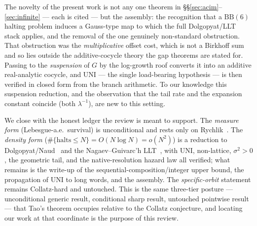 \documentclass[11pt]{article}
\begin{document}
The novelty of the present work is not any one theorem in
\S\S\ref{sec:acim}--\ref{sec:infinite} --- each is cited --- but the assembly:
the recognition that a $\mathrm{BB}(6)$ halting problem induces a Gauss-type map
to which the full Dolgopyat/LLT stack applies, and the removal of the one
genuinely non-standard obstruction. That obstruction was the
\emph{multiplicative} offset cost, which is not a Birkhoff sum and so lies
outside the additive-cocycle theory the gap theorems are stated for. Passing to
the \emph{suspension} of $G$ by the log-growth roof converts it into an additive
real-analytic cocycle, and UNI --- the single load-bearing hypothesis --- is
then verified in closed form from the branch arithmetic. To our knowledge this
suspension reduction, and the observation that the tail rate and the expansion
constant coincide (both $\lambda^{-1}$), are new to this setting.

We close with the honest ledger the review is meant to support. The
\emph{measure form} (Lebesgue-a.e.\ survival) is unconditional and rests only on
Rychlik~\cite{Rychlik1983}. The \emph{density form} ($\#\{\text{halts}\le
N\}=O(N\log N)=o(N^2)$) is a reduction to
Dolgopyat/Naud~\cite{Dolgopyat1998,Naud2005} and the Nagaev--Guivarc'h
LLT~\cite{HennionHerve2001,AaronsonDenker2001}, with UNI, non-lattice,
$\sigma^2>0$, the geometric tail, and the native-resolution hazard law all
verified; what remains is the write-up of the sequential-composition/integer
upper bound, the propagation of UNI to long words, and the assembly. The
\emph{specific-orbit} statement remains Collatz-hard and untouched. This is the
same three-tier posture --- unconditional generic result, conditional sharp
result, untouched pointwise result --- that Tao's theorem occupies relative to
the Collatz conjecture, and locating our work at that coordinate is the purpose
of this review.
\end{document}
